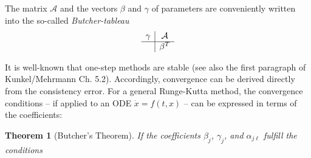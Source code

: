 \documentclass[]{book}
\newtheorem{theorem}{Theorem}[chapter]
\theoremstyle{definition}
\theoremstyle{definition}
\theoremstyle{definition}
\theoremstyle{definition}
\theoremstyle{remark}
\begin{document}
The matrix \(\mathcal A\) and the vectors \(\beta\) and \(\gamma\) of parameters are conveniently written into the so-called \emph{Butcher-tableau}
\[
\begin{array}{c|c}
 \gamma & \mathcal A \\
 \hline
  & \beta^T \\
\end{array}
\]

It is well-known that one-step methods are stable (see also the first paragraph of Kunkel/Mehrmann Ch. 5.2). Accordingly, convergence can be derived directly from the consistency error. For a general Runge-Kutta method, the convergence conditions -- if applied to an ODE \(\dot x = f(t,x)\) -- can be expressed in terms of the coefficients:

\begin{theorem}[Butcher's Theorem]
\protect\hypertarget{thm:v-butcher}{}{\label{thm:v-butcher} {} }If the coefficients \(\beta_j\), \(\gamma_j\), and \(\alpha_{j\ell}\) fulfill the conditions


\end{theorem}
\end{document}
